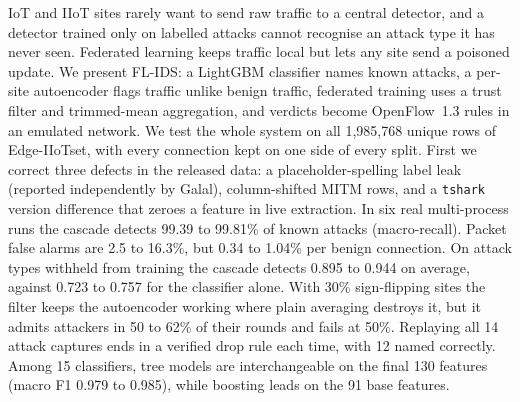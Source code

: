 IoT and IIoT sites rarely want to send raw traffic to a central detector, and a detector trained only on labelled attacks cannot recognise an attack type it has never seen. Federated learning keeps traffic local but lets any site send a poisoned update. We present FL-IDS: a LightGBM classifier names known attacks, a per-site autoencoder flags traffic unlike benign traffic, federated training uses a trust filter and trimmed-mean aggregation, and verdicts become OpenFlow~1.3 rules in an emulated network. We test the whole system on all 1,985,768 unique rows of Edge-IIoTset, with every connection kept on one side of every split. First we correct three defects in the released data: a placeholder-spelling label leak (reported independently by Galal), column-shifted MITM rows, and a \texttt{tshark} version difference that zeroes a feature in live extraction. In six real multi-process runs the cascade detects 99.39 to 99.81\% of known attacks (macro-recall). Packet false alarms are 2.5 to 16.3\%, but 0.34 to 1.04\% per benign connection. On attack types withheld from training the cascade detects 0.895 to 0.944 on average, against 0.723 to 0.757 for the classifier alone. With 30\% sign-flipping sites the filter keeps the autoencoder working where plain averaging destroys it, but it admits attackers in 50 to 62\% of their rounds and fails at 50\%. Replaying all 14 attack captures ends in a verified drop rule each time, with 12 named correctly. Among 15 classifiers, tree models are interchangeable on the final 130 features (macro F1 0.979 to 0.985), while boosting leads on the 91 base features.
